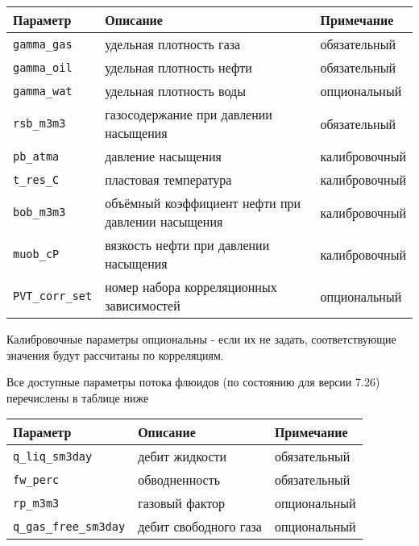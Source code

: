 \begin{center}
	\begin{tabular}{ |m{8em}|m{15em}|m{7.5em}| } 
		\hline
		Параметр & Описание & Примечание \\ 
		\hline
		\texttt{gamma_gas} & удельная плотность газа & обязательный \\ 
		\texttt{gamma_oil} & удельная плотность нефти & обязательный \\ 
		\texttt{gamma_wat} & удельная плотность воды & опциональный \\ 
		\texttt{rsb_m3m3} & газосодержание при давлении насыщения & обязательный \\ 
		\hline
		\texttt{pb_atma} & давление насыщения & калибровочный\\ 
		\texttt{t_res_C} & пластовая температура & калибровочный\\ 
		\texttt{bob_m3m3} & объёмный коэффициент нефти при давлении насыщения & калибровочный\\
		\texttt{muob_cP} & вязкость нефти при давлении насыщения & калибровочный \\
		\hline
		\texttt{PVT_corr_set} & номер набора корреляционных зависимостей & опциональный \\
		\hline
	\end{tabular}
\end{center}

Калибровочные параметры опциональны - если их не задать, соответствующие значения будут рассчитаны по корреляциям.


Все доступные параметры потока флюидов (по состоянию для версии 7.26) перечислены в таблице ниже

\begin{center}
	\begin{tabular}{  |m{11em}|m{12em}|m{7.5em}| } 
		\hline
		Параметр & Описание & Примечание \\ 
		\hline
		\texttt{q_liq_sm3day} & дебит жидкости & обязательный \\ 
		\texttt{fw_perc} & обводненность & обязательный \\ 
		\texttt{rp_m3m3} & газовый фактор & опциональный \\ 
		\texttt{q_gas_free_sm3day} & дебит свободного газа & опциональный \\ 
		\hline
	\end{tabular}
\end{center}

